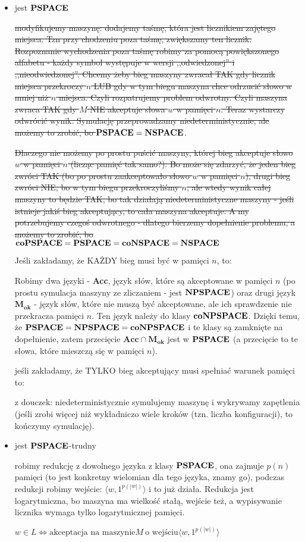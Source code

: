 \begin{itemize}
    \item jest $\textbf{PSPACE}$
    
    \sout{modyfikujemy maszynę: dodajemy taśmę, która jest licznikiem zajętego miejsca. Tzn przy chodzeniu poza taśmę, zwiększamy ten licznik. Rozpoznanie wychodzenia poza taśmę robimy za pomocą powiększonego alfabetu - każdy symbol występuje w wersji ,,odwiedzonej'' i ,,nieodwiedzonej''. Chcemy żeby bieg maszyny zwracał TAK gdy licznik miejsca przekroczy $n$ LUB gdy w tym biegu maszyna chce odrzucić słowo w mniej niż $n$ miejsca. Czyli rozpatrujemy problem odwrotny. Czyli maszyna zwraca TAK gdy $M$ NIE akceptuje słowa $w$ w pamięci $n$. Teraz wystarczy odwrócić wynik. Symulację przeprowadzamy niedeterministycznie, ale możemy to zrobić, bo $\textbf{PSPACE} = \textbf{NSPACE}$}. 
    
    \sout{Dlaczego nie możemy po prostu puścić maszyny, której bieg akceptuje słowo $w$ w pamięci $n$ (licząc pamięć tak samo?). Bo może się zdarzyć, że jeden bieg zwróci TAK (bo po prostu zaakceptowało słowo $w$ w pamięci $n$), drugi bieg zwróci NIE, bo w tym biegu przekroczyliśmy $n$, ale wtedy wynik całej maszyny to będzie TAK, bo tak działają niedeterministyczne maszyny - jeśli istnieje jakiś bieg akceptujący, to cała maszyna akceptuje. A my potrzebujemy czegoś odwrotnego - dlatego bierzemy dopełnienie problemu, a możemy to zrobić, bo  $\textbf{co}\textbf{PSPACE} = \textbf{PSPACE} = \textbf{co}\textbf{NSPACE} = \textbf{NSPACE}$}
    
    Jeśli zakładamy, że KAŻDY bieg musi być w pamięci $n$, to:
    
    Robimy dwa języki - \textbf{Acc}, język słów, które są akceptowane w pamięci $n$ (po prostu symulacja maszyny ze zliczaniem - jest $\textbf{NPSPACE}$) oraz drugi język $\textbf{M}_{\textbf{ok}}$ - język słów, które nie muszą być akceptowane, ale ich sprawdzenie nie przekracza pamięci $n$. Ten język należy do klasy $\textbf{co}\textbf{NPSPACE}$. Dzięki temu, że $\textbf{PSPACE} = \textbf{NPSPACE} = \textbf{co}\textbf{NPSPACE}$ i te klasy są zamknięte na dopełnienie, zatem przecięcie $\textbf{Acc} \cap \textbf{M}_{\textbf{ok}}$ jest w $\textbf{PSPACE}$ (a przecięcie to te słowa, które mieszczą się w pamięci $n$).
    
    jeśli zakładamy, że TYLKO bieg akceptujący musi spełniać warunek pamięci to:
    
    z douczek: niedeterministycznie symulujemy maszynę i wykrywamy zapętlenia (jeśli zrobi więcej niż wykładniczo wiele kroków (tzn. liczba konfiguracji), to kończymy symulację).
    
    \item jest $\textbf{PSPACE}$-trudny
    
    robimy redukcję z dowolnego języka z klasy $\textbf{PSPACE}$, ona zajmuje $p(n)$ pamięci (to jest konkretny wielomian dla tego języka, znamy go), podczas redukcji robimy wejście: $\langle w, 1^{p(|w|)} \rangle$ i to już działa. Redukcja jest logarytmiczna, bo maszyna ma wielkość stałą, wejście też, a wypisywanie licznika wymaga tylko logarytmicznej pamięci.
    
    $w \in L \iff \text{akceptacja na maszynie} M\ \text{o wejściu} \langle w, 1^{p(|w|)} \rangle$
    
\end{itemize}

